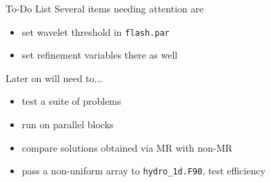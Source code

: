 \documentclass{beamer}
\begin{document}
\begin{frame}[fragile]{To-Do List}
  Several items needing attention are
  \begin{itemize}
    \setlength\itemsep{1em}
    \item set wavelet threshold in \texttt{flash.par}
    \item set refinement variables there as well
  \end{itemize}
  Later on will need to...
  \begin{itemize}
    \item test a suite of problems
    \item run on parallel blocks
    \item compare solutions obtained via MR with non-MR
    \item pass a non-uniform array to \texttt{hydro\_1d.F90}, test efficiency
  \end{itemize}
\end{frame}
\end{document}
